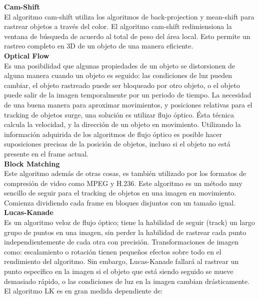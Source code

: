 \textbf{Cam-Shift}\\

El algoritmo cam-shift utiliza los algoritmos de back-projection y mean-shift para rastrear objetos a través del color. El algoritmo cam-shift redimiensiona la ventana de búsqueda de acuerdo al total de peso del área local. Esto permite un rastreo completo en 3D de un objeto de una manera eficiente.\\

\textbf{Optical Flow}\\

Es una posibilidad que algunas propiedades de un objeto se distorsionen de alguna manera cuando un objeto es seguido: las condiciones de luz pueden cambiar, el objeto rastreado puede ser bloqueado por otro objeto, o el objeto puede salir de la imagen temporalmente por un periodo de tiempo. La necesidad de una buena manera para aproximar movimientos, y posiciones relativas para el tracking de objetos surge, una solución es utilizar flujo óptico. Ésta técnica calcula la velocidad, y la dirección de un objeto en movimiento. Utilizando la información adquirida de los algoritmos de flujo óptico es posible hacer suposiciones precisas de la posición de objetos, incluso si el objeto no está presente en el frame actual.\\

\textbf{Block Matching}\\

Este algoritmo además de otras cosas, es también utilizado por los formatos de compresión de video como MPEG y H.236. Este algoritmo es un método muy sencillo de seguir para el tracking de objetos en una imagen en movimiento. Comienza dividiendo cada frame en bloques disjuntos con un tamaño igual. \\

\textbf{Lucas-Kanade}\\

Es un algoritmo veloz de flujo óptico; tiene la habilidad de seguir (track) un largo grupo de puntos en una imagen, sin perder la habilidad de rastrear cada punto independientemente de cada otra con precisión. Transformaciones de imagen como: escalamiento o rotación tienen pequeños efectos sobre todo en el rendimiento del algoritmo. Sin embargo, Lucas-Kanade fallará al rastrear un punto específico en la imagen si el objeto que está siendo seguido se mueve demasiado rápido, o las condiciones de luz en la imagen cambian drásticamente. \\
El algoritmo LK es en gran medida dependiente de:\\

